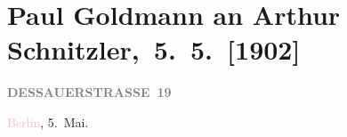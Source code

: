 

\renewcommand{\erwaehntePersonen}{Personen: Eduard Bacher, Moriz Benedikt, Hugo Ganz, Paul Goldmann, Olga Schnitzler, Heinrich Schnitzler}
\renewcommand{\erwaehnteInstitutionen}{Institutionen: Die Zeit, Neue Freie Presse}
\renewcommand{\erwaehnteOrte}{Orte: Berlin, Brühl, Dessauer Straße, Hauptstraße 56, Hinterbrühl, Wien}
\renewcommand{\erwaehnteWerke}{Werke: Neue Freie Presse}
\section[ Paul Goldmann an Arthur Schnitzler, 5. 5. {[}1902{]}]{Paul Goldmann an Arthur Schnitzler, 5. 5. {[}1902{]}}
\nopagebreak{}
\rehead{ }\normalsize\beginnumbering{}
\toendnotes[C]{\smallbreak\pagebreak[2]}
\toendnotes[C]{\smallbreak}
\pstart
           \noindent{}\raggedleft{}{\pb}\textcolor{pink}{\textcolor{gray}{\textbf{DESSAUERSTRASSE 19}}}{}\ledrightnote{\textcolor{pink}{Dessauer Straße}}\pend
           
\pstart
           \textcolor{pink}{Berlin}{}\ledrightnote{\textcolor{pink}{Berlin}}, 5. Mai.\pend
           
